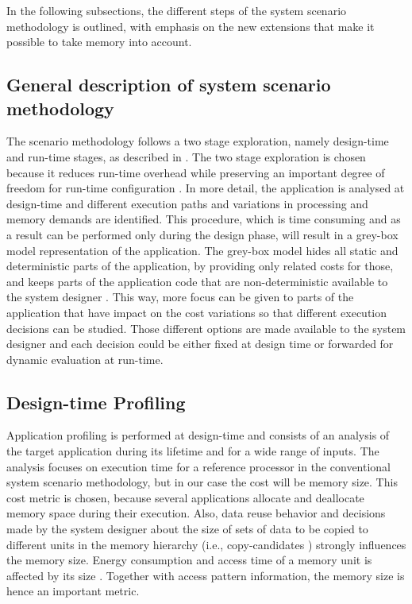 In the following subsections, the different steps of the system scenario methodology is outlined, with emphasis on the new extensions that make it possible to take memory into account. 

\subsection{General description of system scenario methodology}

The scenario methodology follows a two stage exploration, namely design-time and run-time stages, as described in \cite{Gheorghita2007}. The two stage exploration is chosen because it reduces run-time overhead while preserving an important degree of freedom for run-time configuration \cite{tcm}. In more detail, the application is analysed at design-time and different execution paths and variations in processing and memory demands are identified. This procedure, which is time consuming and as a result can be performed only during the design phase, will result in a grey-box model representation of the application. The grey-box model hides all static and deterministic parts of the application, by providing only related costs for those, and keeps parts of the application code that are non-deterministic available to the system designer \cite{graybox}. This way, more focus can be given to parts of the application that have impact on the cost variations so that different execution decisions can be studied. Those different options are made available to the system designer and each decision could be either fixed at design time or forwarded for dynamic evaluation at run-time.

\subsection{Design-time Profiling}

Application profiling is performed at design-time and consists of an analysis of the target application during its lifetime and for a wide range of inputs. The analysis focuses on execution time for a reference processor in the conventional system scenario methodology, but in our case the cost will be memory size. This cost metric is chosen, because several applications allocate and deallocate memory space during their execution. Also, data reuse behavior and decisions made by the system designer about the size of sets of data to be copied to different units in the memory hierarchy (i.e., copy-candidates \cite{dtse}) strongly influences the memory size. Energy consumption and access time of a memory unit is affected by its size \cite{patterson}. Together with access pattern information, the memory size is hence an important metric.

